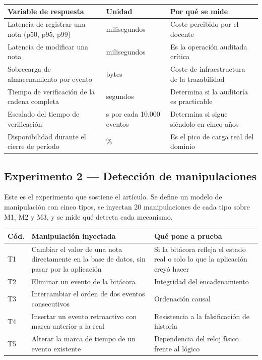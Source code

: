 \documentclass[11pt,a4paper]{article}
\begin{document}
\begin{center}
	\small
	\begin{tabular}{@{}p{5.2cm}p{3.4cm}p{6.4cm}@{}}
		\toprule
		\textbf{Variable de respuesta} & \textbf{Unidad} & \textbf{Por qué se mide} \\
		\midrule
		Latencia de registrar una nota (p50, p95, p99) & milisegundos & Coste percibido por el docente \\
		Latencia de modificar una nota & milisegundos & Es la operación auditada crítica \\
		Sobrecarga de almacenamiento por evento & bytes & Coste de infraestructura de la trazabilidad \\
		Tiempo de verificación de la cadena completa & segundos & Determina si la auditoría es practicable \\
		Escalado del tiempo de verificación & s por cada 10.000 eventos & Determina si sigue siéndolo en cinco años \\
		Disponibilidad durante el cierre de período & \% & Es el pico de carga real del dominio \\
		\bottomrule
	\end{tabular}
\end{center}

\subsection{Experimento 2 --- Detección de manipulaciones}

Este es el experimento que sostiene el artículo. Se define un modelo de manipulación con cinco tipos, se inyectan 20 manipulaciones de cada tipo sobre M1, M2 y M3, y se mide qué detecta cada mecanismo.

\begin{center}
	\small
	\begin{tabular}{@{}p{1.1cm}p{6.2cm}p{7.7cm}@{}}
		\toprule
		\textbf{Cód.} & \textbf{Manipulación inyectada} & \textbf{Qué pone a prueba} \\
		\midrule
		T1 & Cambiar el valor de una nota directamente en la base de datos, sin pasar por la aplicación & Si la bitácora refleja el estado real o solo lo que la aplicación creyó hacer \\
		\addlinespace
		T2 & Eliminar un evento de la bitácora & Integridad del encadenamiento \\
		\addlinespace
		T3 & Intercambiar el orden de dos eventos consecutivos & Ordenación causal \\
		\addlinespace
		T4 & Insertar un evento retroactivo con marca anterior a la real & Resistencia a la falsificación de historia \\
		\addlinespace
		T5 & Alterar la marca de tiempo de un evento existente & Dependencia del reloj físico frente al lógico \\
		\bottomrule
	\end{tabular}
\end{center}
\end{document}
